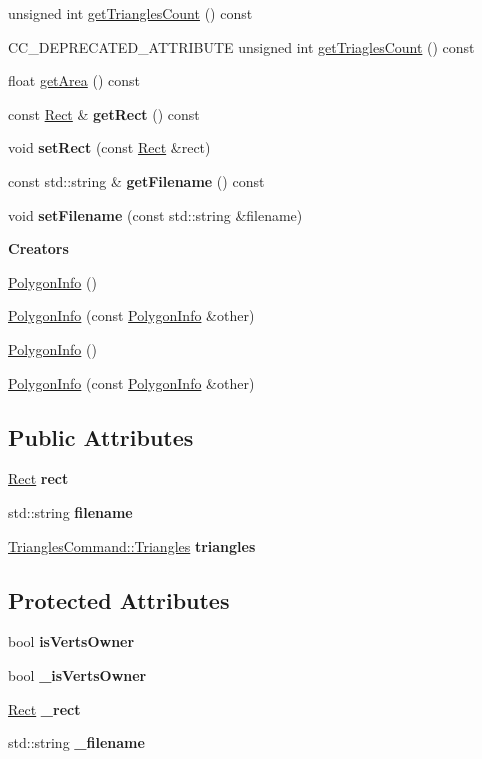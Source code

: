 \begin{DoxyCompactItemize}
\item 
unsigned int \hyperlink{classPolygonInfo_ga0ca8e8c33d34a16c1f8cf33d13aeea2b}{get\+Triangles\+Count} () const
\item 
C\+C\+\_\+\+D\+E\+P\+R\+E\+C\+A\+T\+E\+D\+\_\+\+A\+T\+T\+R\+I\+B\+U\+TE unsigned int \hyperlink{classPolygonInfo_ga29950bcfeaeaa13bca256166562caabc}{get\+Triagles\+Count} () const
\item 
float \hyperlink{classPolygonInfo_gae6fa5ff93a6637153aa41a755486c21b}{get\+Area} () const
\item 
const \hyperlink{classRect}{Rect} \& {\bfseries get\+Rect} () const
\item 
void {\bfseries set\+Rect} (const \hyperlink{classRect}{Rect} \&rect)
\item 
const std\+::string \& {\bfseries get\+Filename} () const
\item 
void {\bfseries set\+Filename} (const std\+::string \&filename)
\end{DoxyCompactItemize}
\begin{Indent}\textbf{ Creators}\par
\begin{DoxyCompactItemize}
\item 
\hyperlink{group____2d_ga069ceb08829c62f4d834b633b86ae420}{Polygon\+Info} ()
\item 
\hyperlink{group____2d_gaf6fd909ca1d09d9b4acff7ca0be82683}{Polygon\+Info} (const \hyperlink{classPolygonInfo}{Polygon\+Info} \&other)
\item 
\hyperlink{group____2d_ga069ceb08829c62f4d834b633b86ae420}{Polygon\+Info} ()
\item 
\hyperlink{group____2d_gaf6fd909ca1d09d9b4acff7ca0be82683}{Polygon\+Info} (const \hyperlink{classPolygonInfo}{Polygon\+Info} \&other)
\end{DoxyCompactItemize}
\end{Indent}
\subsection*{Public Attributes}
\begin{DoxyCompactItemize}
\item 
\hyperlink{classRect}{Rect} {\bfseries rect}
\item 
std\+::string {\bfseries filename}
\item 
\hyperlink{structTrianglesCommand_1_1Triangles}{Triangles\+Command\+::\+Triangles} {\bfseries triangles}
\end{DoxyCompactItemize}
\subsection*{Protected Attributes}
\begin{DoxyCompactItemize}
\item 
bool {\bfseries is\+Verts\+Owner}
\item 
bool {\bfseries \+\_\+is\+Verts\+Owner}
\item 
\hyperlink{classRect}{Rect} {\bfseries \+\_\+rect}
\item 
std\+::string {\bfseries \+\_\+filename}
\end{DoxyCompactItemize}


